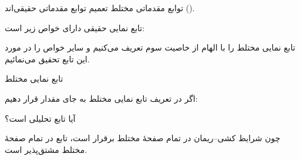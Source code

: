 توابع مقدماتی مختلط تعمیم توابع مقدماتی حقیقی‌اند ().


تابع نمایی حقیقی  دارای خواص زیر است:


تابع نمایی مختلط را با الهام از خاصیت سوم تعریف می‌کنیم و سایر خواص را در مورد این تابع تحقیق می‌نمائیم.

\begin{EMdefinition}{تابع نمایی مختلط}


\end{EMdefinition}

اگر در تعریف تابع نمایی مختلط به جای  مقدار  قرار دهیم:


\begin{EMimportant}{}


\end{EMimportant}

\begin{EMexample}{}

آیا تابع  تحلیلی است؟

چون شرایط کشی--ریمان در تمام صفحهٔ مختلط برقرار است، تابع  در تمام صفحهٔ مختلط مشتق‌پذیر است.

\end{EMexample}

